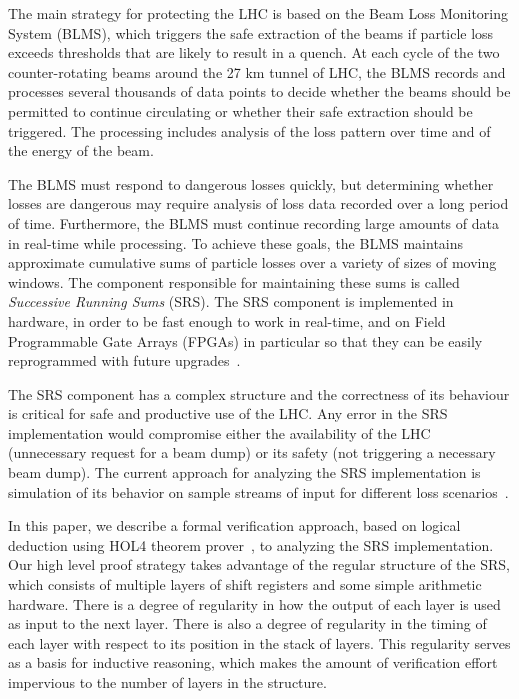 \documentclass{llncs}
\begin{document}
The main strategy for protecting the LHC is based on the Beam Loss Monitoring System (BLMS), which triggers the safe extraction of the beams if particle loss exceeds thresholds that are likely to result in a quench.
At each cycle of the two counter-rotating beams around the 27 km tunnel of LHC, the BLMS records and processes several thousands of data points to decide whether the beams should be permitted to continue circulating or whether their safe extraction should be triggered.
The processing includes analysis of the loss pattern over time and of the energy of the beam.

The BLMS must respond to dangerous losses quickly, but determining whether losses are dangerous may require analysis of loss data recorded over a long period of time.
Furthermore, the BLMS must continue recording large amounts of data in real-time while processing.
To achieve these goals, the BLMS maintains approximate cumulative sums of particle losses over a variety of sizes of moving windows.
The component responsible for maintaining these sums is called \emph{Successive Running Sums} (SRS).
The SRS component is implemented in hardware, in order to be fast enough to work in real-time, and on Field Programmable Gate Arrays (FPGAs) in particular so that they can be easily reprogrammed with future upgrades~\cite{Chris-FPGA}.

The SRS component has a complex structure and the correctness of its behaviour is critical for safe and productive use of the LHC.
Any error in the SRS implementation would compromise either the availability of the LHC (unnecessary request for a beam dump) or its safety (not triggering a necessary beam dump).
The current approach for analyzing the SRS implementation is simulation of its behavior on sample streams of input for different loss scenarios~\cite{Chris-thesis}.

In this paper, we describe a formal verification approach, based on logical deduction using HOL4 theorem prover~\cite{HOL4,DBLP:conf/tphol/SlindN08}, to analyzing the SRS implementation.
Our high level proof strategy takes advantage of the regular structure of the SRS, which consists of multiple layers of shift registers and some simple arithmetic hardware.
There is a degree of regularity in how the output of each layer is used as input to the next layer.
There is also a degree of regularity in the timing of each layer with respect to its position in the stack of layers.
This regularity serves as a basis for inductive reasoning, which makes the amount of verification effort impervious to the number of layers in the structure.
\end{document}
